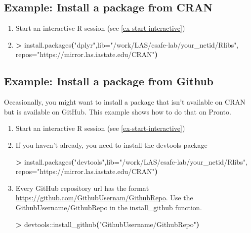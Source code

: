 \documentclass[
]{book}
\newenvironment{Shaded}{\begin{snugshade}}{\end{snugshade}}
\newcommand{\ExtensionTok}[1]{#1}
\newcommand{\KeywordTok}[1]{\textcolor[rgb]{0.13,0.29,0.53}{\textbf{#1}}}
\newcommand{\NormalTok}[1]{#1}
\newcommand{\OperatorTok}[1]{\textcolor[rgb]{0.81,0.36,0.00}{\textbf{#1}}}
\newcommand{\StringTok}[1]{\textcolor[rgb]{0.31,0.60,0.02}{#1}}
\begin{document}
\hypertarget{ex-interactive-install}{%
\subsection{Example: Install a package from CRAN}\label{ex-interactive-install}}

\begin{enumerate}
\def\labelenumi{\arabic{enumi}.}
\item
  Start an interactive R session (see \ref{ex-start-interactive})
\item
\begin{Shaded}
\begin{Highlighting}[]
\OperatorTok{\textgreater{}}\NormalTok{ install.packages}\KeywordTok{(}\StringTok{"dplyr"}\ExtensionTok{,lib=}\StringTok{"/work/LAS/csafe{-}lab/your\_netid/Rlibs"}\ExtensionTok{,}\NormalTok{ repos=}\StringTok{"https://mirror.las.iastate.edu/CRAN"}\KeywordTok{)}
\end{Highlighting}
\end{Shaded}
\end{enumerate}

\hypertarget{ex-interactive-install-github}{%
\subsection{Example: Install a package from Github}\label{ex-interactive-install-github}}

Occasionally, you might want to install a package that isn't available on CRAN but is available on GitHub. This example shows how to do that on Pronto.

\begin{enumerate}
\def\labelenumi{\arabic{enumi}.}
\item
  Start an interactive R session (see \ref{ex-start-interactive})
\item
  If you haven't already, you need to install the devtools package

\begin{Shaded}
\begin{Highlighting}[]
\OperatorTok{\textgreater{}}\NormalTok{ install.packages}\KeywordTok{(}\StringTok{"devtools"}\ExtensionTok{,lib=}\StringTok{"/work/LAS/csafe{-}lab/your\_netid/Rlibs"}\ExtensionTok{,}\NormalTok{ repos=}\StringTok{"https://mirror.las.iastate.edu/CRAN"}\KeywordTok{)}
\end{Highlighting}
\end{Shaded}
\item
  Every GitHub repository url has the format \url{https://github.com/GithubUsernam/GithubRepo}. Use the GithubUsername/GithubRepo in the install\_github function.

\begin{Shaded}
\begin{Highlighting}[]
\OperatorTok{\textgreater{}}\NormalTok{ devtools::install\_github}\KeywordTok{(}\StringTok{"GithubUsername/GithubRepo"}\KeywordTok{)}
\end{Highlighting}
\end{Shaded}
\end{enumerate}
\end{document}
